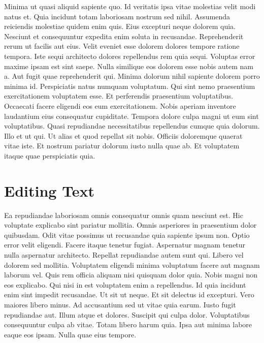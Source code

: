 Minima ut quasi aliquid sapiente quo. Id veritatis ipsa vitae molestias velit
modi natus et. Quia incidunt totam laboriosam nostrum sed nihil. Assumenda
reiciendis molestiae quidem enim quis. Eius excepturi neque dolorem quia.
Nesciunt et consequuntur expedita enim soluta in recusandae. Reprehenderit
rerum ut facilis aut eius. Velit eveniet esse dolorem dolores tempore ratione
tempora. Iste sequi architecto dolores repellendus rem quia sequi. Voluptas
error maxime ipsam est sint saepe. Nulla similique eos dolorem esse nobis autem
nam a. Aut fugit quae reprehenderit qui. Minima dolorum nihil sapiente dolorem
porro minima id. Perspiciatis natus numquam voluptatum. Qui sint nemo
praesentium exercitationem voluptatem esse. Et perferendis praesentium
voluptatibus. Occaecati facere eligendi eos eum exercitationem. Nobis aperiam
inventore laudantium eius consequatur cupiditate. Tempora dolore culpa magni ut
eum sint voluptatibus. Quasi repudiandae necessitatibus repellendus cumque quia
dolorum. Illo et ut qui. Ut alias et quod repellat sit nobis. Officiis
doloremque quaerat vitae iste. Et nostrum pariatur dolorum iusto nulla quae ab.
Et voluptatem itaque quae perspiciatis quia.


\chapter*{Editing Text}

Ea repudiandae laboriosam omnis consequatur omnis quam nesciunt est. Hic
voluptate explicabo sint pariatur mollitia. Omnis asperiores in praesentium
dolor quibusdam. Odit vitae possimus ut recusandae quia sapiente ipsum non.
Optio error velit eligendi. Facere itaque tenetur fugiat. Aspernatur magnam
tenetur nulla aspernatur architecto. Repellat repudiandae autem sunt qui.
Libero vel dolorem sed mollitia. Voluptatem eligendi minima voluptatum facere
aut magnam laborum vel. Quis rem officia aliquam nisi quisquam dolor quia.
Nobis magni non eos explicabo. Qui nisi in est voluptatem enim a repellendus.
Id quia incidunt enim sint impedit recusandae. Ut sit ut neque. Et sit delectus
id excepturi. Vero maiores libero minus. Ad accusantium sed ut vitae quia
earum. Iusto fugit repudiandae aut. Illum atque et dolores. Suscipit qui culpa
dolor. Voluptatibus consequuntur culpa ab vitae. Totam libero harum quia. Ipsa
aut minima labore eaque eos ipsam. Nulla quae eius tempore.

\@openrighttrue\makeatother
